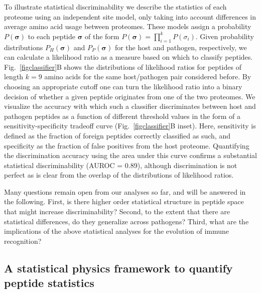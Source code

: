 \documentclass[superscriptaddress,twocolumn,pre]{revtex4}
\newcommand{\B}{\boldsymbol}
\newcommand{\<}{\langle}
\renewcommand{\>}{\rangle}
\begin{document}
To illustrate statistical discriminability we describe the statistics of each proteome using an independent site model, only taking into account differences in average amino acid usage between proteomes. These models assign a probability $P(\B \sigma)$ to each peptide $\B \sigma$ of the form $P(\B \sigma) = \prod_{i=1}^k P(\sigma_i)$. Given probability distributions $P_H(\B \sigma)$ and $P_P(\B \sigma)$ for the host and pathogen, respectively, we can calculate a likelihood ratio as a measure based on which to classify peptides. Fig.~\ref{figclassifier}B shows the distributions of likelihood ratios for peptides of length $k=9$ amino acids for the same host/pathogen pair considered before. By choosing an appropriate cutoff one can turn the likelihood ratio into a binary decision of whether a given peptide originates from one of the two proteomes. We visualize the accuracy with which such a classifier discriminates between host and pathogen peptides as a function of different threshold values in the form of a sensitivity-specificity tradeoff curve (Fig.~\ref{figclassifier}B inset). Here, sensitivity is defined as the fraction of foreign peptides correctly classified as such, and specificity as the fraction of false positives from the host proteome. Quantifying the discrimination accuracy using the area under this curve confirms a substantial statistical discriminability (AUROC = 0.89), although discrimination is not perfect as is clear from the overlap of the distributions of likelihood ratios.


Many questions remain open from our analyses so far, and will be answered in the following. First, is there higher order statistical structure in peptide space that might increase discriminability? Second, to the extent that there are statistical differences, do they generalize across pathogens? Third, what are the implications of the above statistical analyses for the evolution of immune recognition?


\subsection{A statistical physics framework to quantify peptide statistics} 
\end{document}
